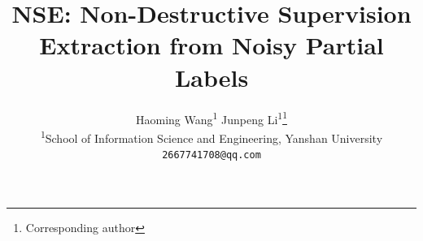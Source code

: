 \documentclass[10pt,twocolumn,letterpaper]{article}
\begin{document}
\title{NSE: Non-Destructive Supervision Extraction from Noisy Partial Labels}

\author{Haoming Wang\textsuperscript{1} \quad Junpeng Li\textsuperscript{1}\thanks{Corresponding author} \\
\textsuperscript{1}School of Information Science and Engineering, Yanshan University\\
{\tt\small 2667741708@qq.com}
}

\maketitle









{\small
\clearpage



}
\end{document}
